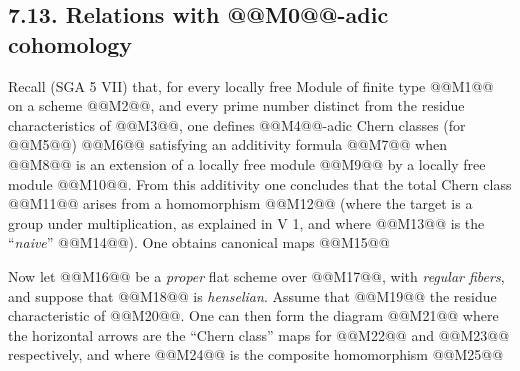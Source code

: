 
\subsection*{7.13. Relations with @@M0@@-adic cohomology}
Recall (SGA 5 VII) that, for every locally free Module of finite type @@M1@@ on a scheme @@M2@@, and every prime number distinct from the residue characteristics of @@M3@@, one defines @@M4@@-adic Chern classes (for @@M5@@)
@@M6@@
satisfying an additivity formula
@@M7@@
when @@M8@@ is an extension of a locally free module @@M9@@ by a locally free module @@M10@@. From this additivity one concludes that the total Chern class @@M11@@ arises from a homomorphism
@@M12@@
(where the target is a group under multiplication, as explained in V 1, and where @@M13@@ is the ``\emph{naive}'' @@M14@@). One obtains canonical maps
@@M15@@

Now let @@M16@@ be a \emph{proper} flat scheme over @@M17@@, with \emph{regular fibers}, and suppose that @@M18@@ is \emph{henselian}. Assume that @@M19@@ the residue characteristic of @@M20@@. One can then form the diagram
@@M21@@
where the horizontal arrows are the ``Chern class'' maps for @@M22@@ and @@M23@@ respectively, and where @@M24@@ is the composite homomorphism
@@M25@@
